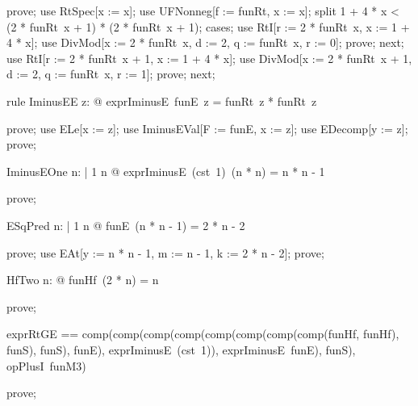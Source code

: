 \documentclass{article}
\begin{document}
\begin{zproof}
prove;
use RtSpec[x := x];
use UFNonneg[f := funRt, x := x];
split 1 + 4 * x < (2 * funRt~x + 1) * (2 * funRt~x + 1);
cases;
use RtI[r := 2 * funRt~x, x := 1 + 4 * x];
use DivMod[x := 2 * funRt~x, d := 2, q := funRt~x, r := 0];
prove;
next;
use RtI[r := 2 * funRt~x + 1, x := 1 + 4 * x];
use DivMod[x := 2 * funRt~x + 1, d := 2, q := funRt~x, r := 1];
prove;
next;
\end{zproof}

\begin{theorem}{rule IminusEE}
  \forall z: \nat @ exprIminusE~funE~z = funRt~z * funRt~z
\end{theorem}

\begin{zproof}
prove;
use ELe[x := z];
use IminusEVal[F := funE, x := z];
use EDecomp[y := z];
prove;
\end{zproof}

\begin{theorem}{IminusEOne}
  \forall n: \nat | 1 \leq n @ exprIminusE~(cst~1)~(n * n) = n * n - 1
\end{theorem}

\begin{zproof}
prove;
\end{zproof}

\begin{theorem}{ESqPred}
  \forall n: \nat | 1 \leq n @ funE~(n * n - 1) = 2 * n - 2
\end{theorem}

\begin{zproof}
prove;
use EAt[y := n * n - 1, m := n - 1, k := 2 * n - 2];
prove;
\end{zproof}

\begin{theorem}{HfTwo}
  \forall n: \nat @ funHf~(2 * n) = n
\end{theorem}

\begin{zproof}
prove;
\end{zproof}

\begin{zed}
  exprRtGE == comp(comp(comp(comp(comp(comp(comp(comp(funHf, funHf), funS), funS), funE), exprIminusE~(cst~1)), exprIminusE~funE), funS), opPlusI~funM3)
\end{zed}

\begin{zproof}
prove;
\end{zproof}
\end{document}
